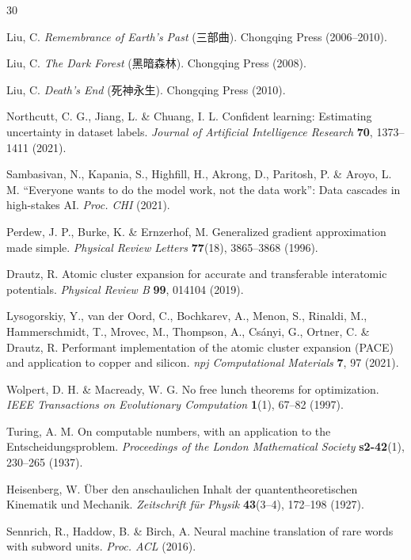 \documentclass[12pt,a4paper]{ctexart}
\begin{document}
\begin{thebibliography}{30}

 Liu, C. \textit{Remembrance of Earth's Past} (三部曲). Chongqing Press (2006--2010).

 Liu, C. \textit{The Dark Forest} (黑暗森林). Chongqing Press (2008).

 Liu, C. \textit{Death's End} (死神永生). Chongqing Press (2010).

 Northcutt, C. G., Jiang, L. \& Chuang, I. L. Confident learning: Estimating uncertainty in dataset labels. \textit{Journal of Artificial Intelligence Research} \textbf{70}, 1373--1411 (2021).

 Sambasivan, N., Kapania, S., Highfill, H., Akrong, D., Paritosh, P. \& Aroyo, L. M. ``Everyone wants to do the model work, not the data work'': Data cascades in high-stakes AI. \textit{Proc. CHI} (2021).

 Perdew, J. P., Burke, K. \& Ernzerhof, M. Generalized gradient approximation made simple. \textit{Physical Review Letters} \textbf{77}(18), 3865--3868 (1996).

 Drautz, R. Atomic cluster expansion for accurate and transferable interatomic potentials. \textit{Physical Review B} \textbf{99}, 014104 (2019).

 Lysogorskiy, Y., van der Oord, C., Bochkarev, A., Menon, S., Rinaldi, M., Hammerschmidt, T., Mrovec, M., Thompson, A., Cs\'anyi, G., Ortner, C. \& Drautz, R. Performant implementation of the atomic cluster expansion (PACE) and application to copper and silicon. \textit{npj Computational Materials} \textbf{7}, 97 (2021).

 Wolpert, D. H. \& Macready, W. G. No free lunch theorems for optimization. \textit{IEEE Transactions on Evolutionary Computation} \textbf{1}(1), 67--82 (1997).

 Turing, A. M. On computable numbers, with an application to the Entscheidungsproblem. \textit{Proceedings of the London Mathematical Society} \textbf{s2-42}(1), 230--265 (1937).

 Heisenberg, W. \"{U}ber den anschaulichen Inhalt der quantentheoretischen Kinematik und Mechanik. \textit{Zeitschrift f\"{u}r Physik} \textbf{43}(3--4), 172--198 (1927).

 Sennrich, R., Haddow, B. \& Birch, A. Neural machine translation of rare words with subword units. \textit{Proc. ACL} (2016).


\end{thebibliography}
\end{document}
